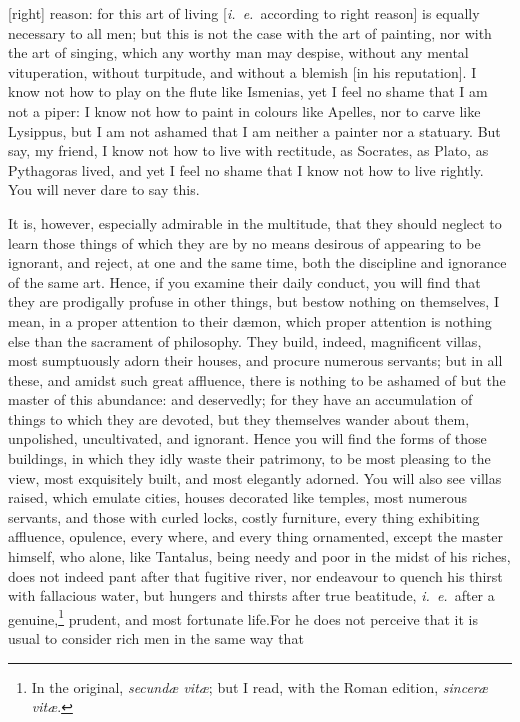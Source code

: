\documentclass[12pt]{article}
\begin{document}
[right] reason: for this art of living [\textit{i.~e.}~according to right
reason] is equally necessary to all men; but this is not the case with the art
of painting, nor with the art of singing, which any worthy man may despise,
without any mental vituperation, without turpitude, and without a blemish [in
his reputation]. I know not how to play on the flute like Ismenias, yet I feel
no shame that I am not a piper: I know not how to paint in colours like
Apelles, nor to carve like Lysippus, but I am not ashamed that I am neither a
painter nor a statuary. But say, my friend, I know not how to live with
rectitude, as Socrates, as Plato, as Pythagoras lived, and yet I feel no shame
that I know not how to live rightly. You will never dare to say this.

It is, however, especially admirable in the multitude, that they should neglect
to learn those things of which they are by no means desirous of appearing to be
ignorant, and reject, at one and the same time, both the discipline and
ignorance of the same art. Hence, if you examine their daily conduct, you will
find that they are prodigally profuse in other things, but bestow nothing on
themselves, I mean, in a proper attention to their d{\ae}mon, which proper
attention is nothing else than the sacrament of philosophy. They build, indeed,
magnificent villas, most sumptuously adorn their houses, and procure numerous
servants; but in all these, and amidst such great affluence, there is nothing
to be ashamed of but the master of this abundance: and deservedly; for they
have an accumulation of things to which they are devoted, but they themselves
wander about them, unpolished, uncultivated, and ignorant. Hence you will find
the forms of those buildings, in which they idly waste their patrimony, to be
most pleasing to the view, most exquisitely built, and most elegantly adorned.
You will also see villas raised, which emulate cities, houses decorated like
temples, most numerous servants, and those with curled locks, costly furniture,
every thing exhibiting affluence, opulence, every where, and every thing
ornamented, except the master himself, who alone, like Tantalus, being needy
and poor in the midst of his riches, does not indeed pant after that fugitive
river, nor endeavour to quench his thirst with fallacious water, but hungers
and thirsts after true beatitude, \textit{i.~e.}~after a genuine,\footnote{In
the original, \textit{secund{\ae} vit{\ae}}; but I read, with the Roman
edition, \textit{sincer{\ae} vit{\ae}}.} prudent, and most fortunate life.For
he does not perceive that it is usual to consider rich men in the same way that
\end{document}

